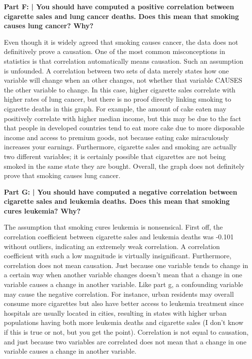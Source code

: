 \documentclass{article}
\begin{document}
 \textbf{Part F: | You should have computed a positive correlation between cigarette sales and lung cancer deaths. Does this mean that smoking causes lung cancer? Why?}\newline
  
 Even though it is widely agreed that smoking causes cancer, the data does not definitively prove a causation. One of the most common misconceptions in statistics is that correlation automatically means causation. Such an assumption is unfounded. A correlation between two sets of data merely states how one variable will change when an other changes, not whether that variable CAUSES the other variable to change. In this case, higher cigarette sales correlate with higher rates of lung cancer, but there is no proof directly linking smoking to cigarette deaths in this graph. For example, the amount of cake eaten may positively correlate with higher median income, but this may be due to the fact that people in developed countries tend to eat more cake due to more disposable income and access to premium goods, not because eating cake miraculously increases your earnings. Furthermore, cigarette sales and smoking are actually two different variables; it is certainly possible that cigarettes are not being smoked in the same state they are bought. Overall, the graph does not definitely prove that smoking causes lung cancer. \newline
 
 \textbf{Part G: | You should have computed a negative correlation between cigarette sales and leukemia deaths. Does this mean that smoking cures leukemia? Why?}\newline
  
 The assumption that smoking cures leukemia is nonsensical. First off, the correlation coefficient between cigarette sales and leukemia deaths was -0.101 without outliers, indicating an extremely weak correlation. A correlation coefficient with such a low magnitude is virtually insignificant. Furthermore, correlation does not mean causation. Just because one variable tends to change in a certain way when another variable changes doesn't mean that a change in one variable causes a change in another variable. Like part g, a confounding variable may cause the negative correlation. For instance, urban residents may overall consume more cigarettes but also have better access to leukemia treatment since hospitals are usually located in cities, resulting in states with higher urban populations having both more leukemia deaths and cigarette sales (I don't know if this is true or not, but you get the point). Correlation is not equal to causation, and just because two variables are correlated does not mean that a change in one variable causes a change in another variable. \newline
 
\end{document}
